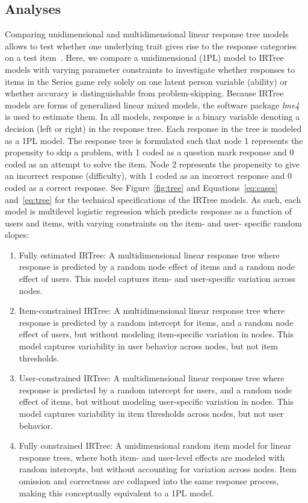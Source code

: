 \documentclass[12pt]{article}
\begin{document}
\subsection{Analyses}
\label{section:analyses}
Comparing unidimensional and multidimensional linear response tree models allows to test whether one underlying trait gives rise to the response categories on a test item~\parencite{de2012irtrees}. Here, we compare a unidimensional (1PL) model to IRTree models with varying parameter constraints to investigate whether responses to items in the Series game rely solely on one latent person variable (ability) or whether accuracy is distinguishable from problem-skipping. Because IRTree models are forms of generalized linear mixed models, the software package \textit{lme4}~\parencite{bates2015package} is used to estimate them. In all models, response is a binary variable denoting a decision (left or right) in the response tree. Each response in the tree is modeled as a 1PL model. The response tree is formulated such that node 1 represents the propensity to skip a problem, with 1 coded as a question mark response and 0 coded as an attempt to solve the item. Node 2 represents the propensity to give an incorrect response (difficulty), with 1 coded as an incorrect response and 0 coded as a correct response. See Figure~\ref{fig:tree} and Equations~\ref{eq:cases} and~\ref{eq:tree} for the technical specifications of the IRTree models. As such, each model is multilevel logistic regression which predicts response as a function of users and items, with varying constraints on the item- and user- specific random slopes: 

\begin{enumerate}
    \item Fully estimated IRTree: A multidimensional linear response tree where response is predicted by a random node effect of items and a random node effect of users. This model captures item- and user-specific variation across nodes. 
    \item Item-constrained IRTree: A multidimensional linear response tree where response is predicted by a random intercept for items, and a random node effect of users, but without modeling item-specific variation in nodes. This model captures variability in user behavior across nodes, but not item thresholds. 
    \item User-constrained IRTree: A multidimensional linear response tree where response is predicted by a random intercept for users, and a random node effect of items, but without modeling user-specific variation in nodes. This model captures variability in item thresholds across nodes, but not user behavior. 
    \item Fully constrained IRTree: A unidimensional random item model for linear response trees, where both item- and user-level effects are modeled with random intercepts, but without accounting for variation across nodes. Item omission and correctness are collapsed into the same response process, making this conceptually equivalent to a 1PL model. 
\end{enumerate}
\end{document}
